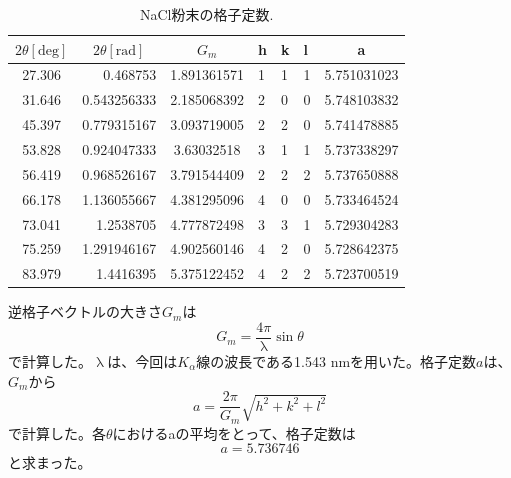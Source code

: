 \documentclass[11pt,a4j,uplatex]{jsarticle}
\begin{document}
\begin{table}[htbp]
 \begin{center}
  \caption{NaCl粉末の格子定数.}
  \begin{tabular}{|c|r|c|lll|c|}  \hline
   $2\theta[\mathrm{deg}]$ & \multicolumn{1}{c|}{$2\theta[\mathrm{rad}]$} & $G_{m}$     & h & k & l & a           \\ \hline  \hline
   27.306                  & 0.468753                                     & 1.891361571 & 1 & 1 & 1 & 5.751031023 \\
   31.646                  & 0.543256333                                  & 2.185068392 & 2 & 0 & 0 & 5.748103832 \\
   45.397                  & 0.779315167                                  & 3.093719005 & 2 & 2 & 0 & 5.741478885 \\
   53.828                  & 0.924047333                                  & 3.63032518  & 3 & 1 & 1 & 5.737338297 \\
   56.419                  & 0.968526167                                  & 3.791544409 & 2 & 2 & 2 & 5.737650888 \\
   66.178                  & 1.136055667                                  & 4.381295096 & 4 & 0 & 0 & 5.733464524 \\
   73.041                  & 1.2538705                                    & 4.777872498 & 3 & 3 & 1 & 5.729304283 \\
   75.259                  & 1.291946167                                  & 4.902560146 & 4 & 2 & 0 & 5.728642375 \\
   83.979                  & 1.4416395                                    & 5.375122452 & 4 & 2 & 2 & 5.723700519 \\  \hline
  \end{tabular}
  \label{pow}
 \end{center}
\end{table}

\newpage
逆格子ベクトルの大きさ$G_{m}$は
\begin{equation}
 G_m=\frac{4\pi}{\uplambda}\sin\theta
 \label{gyakukousi}
\end{equation}
で計算した。$\uplambda$は、今回は$K_\alpha$線の波長である1.543 nmを用いた。格子定数$a$は、$G_{m}$から
\begin{equation}
 a=\frac{2\pi}{G_m}\sqrt{h^2+k^2+l^2}
 \label{kousiteisuu}
\end{equation}
で計算した。各$\theta$におけるaの平均をとって、格子定数は
\begin{equation}
 a=5.736746
 \label{complete}
\end{equation}
と求まった。
\end{document}
